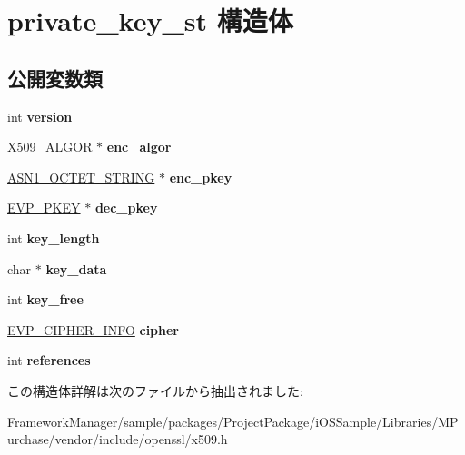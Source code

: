 \hypertarget{structprivate__key__st}{}\section{private\+\_\+key\+\_\+st 構造体}
\label{structprivate__key__st}
\subsection*{公開変数類}
\begin{DoxyCompactItemize}
\item 
\hypertarget{structprivate__key__st_a16bd44f055e649572a0f5b0d62a92219}{}int {\bfseries version}\label{structprivate__key__st_a16bd44f055e649572a0f5b0d62a92219}

\item 
\hypertarget{structprivate__key__st_a866f6478e044bb225e3c9983df4b48a2}{}\hyperlink{struct_x509__algor__st}{X509\+\_\+\+A\+L\+G\+O\+R} $\ast$ {\bfseries enc\+\_\+algor}\label{structprivate__key__st_a866f6478e044bb225e3c9983df4b48a2}

\item 
\hypertarget{structprivate__key__st_a514cc301684203bf755bbc83033f51aa}{}\hyperlink{structasn1__string__st}{A\+S\+N1\+\_\+\+O\+C\+T\+E\+T\+\_\+\+S\+T\+R\+I\+N\+G} $\ast$ {\bfseries enc\+\_\+pkey}\label{structprivate__key__st_a514cc301684203bf755bbc83033f51aa}

\item 
\hypertarget{structprivate__key__st_ab6fa39f8beba82366b4a0c9af1d68231}{}\hyperlink{structevp__pkey__st}{E\+V\+P\+\_\+\+P\+K\+E\+Y} $\ast$ {\bfseries dec\+\_\+pkey}\label{structprivate__key__st_ab6fa39f8beba82366b4a0c9af1d68231}

\item 
\hypertarget{structprivate__key__st_a4fd59ffeb31b0bc4acf1330ba4c1cfab}{}int {\bfseries key\+\_\+length}\label{structprivate__key__st_a4fd59ffeb31b0bc4acf1330ba4c1cfab}

\item 
\hypertarget{structprivate__key__st_a648ff8dfa3759f8cf7e78e8f0acf621e}{}char $\ast$ {\bfseries key\+\_\+data}\label{structprivate__key__st_a648ff8dfa3759f8cf7e78e8f0acf621e}

\item 
\hypertarget{structprivate__key__st_a6cba7d7973cf8425493d996dd8464e29}{}int {\bfseries key\+\_\+free}\label{structprivate__key__st_a6cba7d7973cf8425493d996dd8464e29}

\item 
\hypertarget{structprivate__key__st_afeef179b98e87f1f950eb977dda61fc4}{}\hyperlink{structevp__cipher__info__st}{E\+V\+P\+\_\+\+C\+I\+P\+H\+E\+R\+\_\+\+I\+N\+F\+O} {\bfseries cipher}\label{structprivate__key__st_afeef179b98e87f1f950eb977dda61fc4}

\item 
\hypertarget{structprivate__key__st_a96a0fec0281fed6acf1d455f2d5c93ff}{}int {\bfseries references}\label{structprivate__key__st_a96a0fec0281fed6acf1d455f2d5c93ff}

\end{DoxyCompactItemize}


この構造体詳解は次のファイルから抽出されました\+:\begin{DoxyCompactItemize}
\item 
Framework\+Manager/sample/packages/\+Project\+Package/i\+O\+S\+Sample/\+Libraries/\+M\+Purchase/vendor/include/openssl/x509.\+h\end{DoxyCompactItemize}
